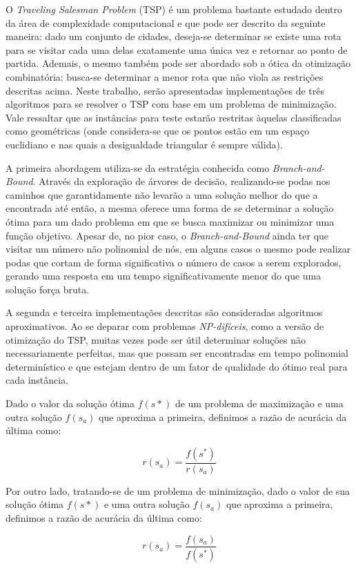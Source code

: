 \documentclass[12pt]{article}
\begin{document}
O \textit{Traveling Salesman Problem} (TSP) é um problema bastante estudado dentro da área de complexidade computacional e que pode ser descrito da seguinte maneira: dado um conjunto de cidades, deseja-se determinar se existe uma rota para se visitar cada uma delas exatamente uma única vez e retornar ao ponto de partida. Ademais, o mesmo também pode ser abordado sob a ótica da otimização combinatória: busca-se determinar a menor rota que não viola as restrições descritas acima. Neste trabalho, serão apresentadas implementações de três algoritmos para se resolver o TSP com base em um problema de minimização. Vale ressaltar que as instâncias para teste estarão restritas àquelas classificadas como geométricas (onde considera-se que os pontos estão em um espaço euclidiano e nas quais a desigualdade triangular é sempre válida).

A primeira abordagem utiliza-se da estratégia conhecida como \textit{Branch-and-Bound}. Através da exploração de árvores de decisão, realizando-se podas nos caminhos que garantidamente não levarão a uma solução melhor do que a encontrada até então, a mesma oferece uma forma de se determinar a solução ótima para um dado problema em que se busca maximizar ou minimizar uma função objetivo. Apesar de, no pior caso, o \textit{Branch-and-Bound} ainda ter que visitar um número não polinomial de nós, em alguns casos o mesmo pode realizar podas que cortam de forma significativa o número de casos a serem explorados, gerando uma resposta em um tempo significativamente menor do que uma solução força bruta.

A segunda e terceira implementações descritas são consideradas algoritmos aproximativos. Ao se deparar com problemas \textit{NP-difíceis}, como a versão de otimização do TSP, muitas vezes pode ser útil determinar soluções não necessariamente perfeitas, mas que possam ser encontradas em tempo polinomial determinístico e que estejam dentro de um fator de qualidade do ótimo real para cada instância.

Dado o valor da solução ótima $f(s*)$ de um problema de maximização e uma outra solução $f(s_a)$ que aproxima a primeira, definimos a razão de acurácia da última como:

$$ r(s_a) = \frac{f(s^*)}{r(s_a)} $$

Por outro lado, tratando-se de um problema de minimização, dado o valor de sua solução ótima $f(s*)$ e uma outra solução $f(s_a)$ que aproxima a primeira, definimos a razão de acurácia da última como:

$$ r(s_a) = \frac{f(s_a)}{f(s^*)} $$
\end{document}
